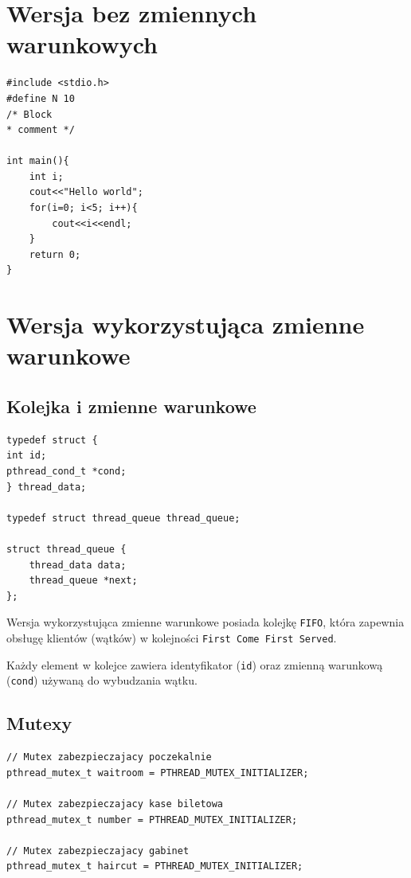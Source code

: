 \documentclass[12pt,a4paper]{article}
\begin{document}
	\section{Wersja bez zmiennych warunkowych}
	
	\lstset{style=customc, language=C}
	\begin{lstlisting}[label = kod, caption = rak]
#include <stdio.h>
#define N 10
/* Block
* comment */

int main(){
	int i;
	cout<<"Hello world";
	for(i=0; i<5; i++){
		cout<<i<<endl;
	}
	return 0;
}

	\end{lstlisting}
	
	
	\section{Wersja wykorzystująca zmienne warunkowe}
	\subsection{Kolejka i zmienne warunkowe}
	
	\begin{center}
		\begin{minipage}{0.8\linewidth}
\begin{lstlisting}[caption = Struktura reprezentująca kolejkę.]
typedef struct {
int id;
pthread_cond_t *cond;
} thread_data;

typedef struct thread_queue thread_queue;

struct thread_queue {
    thread_data data;
    thread_queue *next;
};
\end{lstlisting}
		\end{minipage}
	\end{center}
		
	
	Wersja wykorzystująca zmienne warunkowe posiada kolejkę 
	\texttt{FIFO}, która zapewnia obsługę klientów (wątków) w kolejności 
	\texttt{First Come First Served}.
			
	Każdy element w kolejce zawiera identyfikator (\texttt{id}) oraz
	zmienną warunkową (\texttt{cond}) używaną do wybudzania wątku.
	
	\subsection{Mutexy}
	
	\begin{center}
		\begin{minipage}{0.8\linewidth}
\begin{lstlisting}[caption = Deklaracje mutexów.]
// Mutex zabezpieczajacy poczekalnie
pthread_mutex_t waitroom = PTHREAD_MUTEX_INITIALIZER;

// Mutex zabezpieczajacy kase biletowa
pthread_mutex_t number = PTHREAD_MUTEX_INITIALIZER;

// Mutex zabezpieczajacy gabinet
pthread_mutex_t haircut = PTHREAD_MUTEX_INITIALIZER;
\end{lstlisting}
		\end{minipage}
	\end{center}
	
\end{document}
